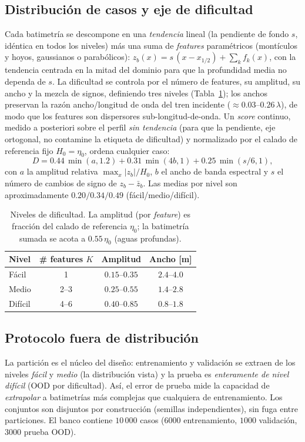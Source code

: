 \documentclass[conference]{IEEEtran}
\newcommand{\zb}{z_b}
\begin{document}
\subsection{Distribución de casos y eje de dificultad}
Cada batimetría se descompone en una \emph{tendencia} lineal (la pendiente de
fondo $s$, idéntica en todos los niveles) más una suma de \emph{features}
paramétricos (montículos y hoyos, gaussianos o parabólicos):
$\zb(x) = s\,(x - x_{1/2}) + \sum_k f_k(x)$, con la tendencia centrada en la
mitad del dominio para que la profundidad media no dependa de $s$. La
dificultad se controla por el número de features, su amplitud, su ancho y la
mezcla de signos, definiendo tres niveles (Tabla~\ref{tab:tiers}); los anchos
preservan la razón ancho/longitud de onda del tren incidente
($\approx0.03$--$0.26\,\lambda$), de modo que los features son dispersores
sub-longitud-de-onda. Un \emph{score} continuo, medido a posteriori sobre el
perfil \emph{sin tendencia} (para que la pendiente, eje ortogonal, no
contamine la etiqueta de dificultad) y normalizado por el calado de referencia
fijo $H_0=\eta_0$, ordena cualquier caso:
\begin{equation}
  D = 0.44\,\min(a,1.2) + 0.31\,\min(4b,1) + 0.25\,\min(s/6,1),
  \label{eq:score}
\end{equation}
con $a$ la amplitud relativa $\max_x|\zb|/H_0$, $b$ el ancho de banda espectral y
$s$ el número de cambios de signo de $\zb-\bar\zb$. Las medias por nivel son
aproximadamente $0.20/0.34/0.49$ (fácil/medio/difícil).

\begin{table}[t]
\centering
\caption{Niveles de dificultad. La amplitud (por \emph{feature}) es fracción del
calado de referencia $\eta_0$; la batimetría sumada se acota a $0.55\,\eta_0$
(aguas profundas).}
\label{tab:tiers}
\begin{tabular}{lccc}
\toprule
Nivel & \# features $K$ & Amplitud & Ancho [m] \\
\midrule
Fácil   & 1   & $0.15$–$0.35$ & $2.4$–$4.0$ \\
Medio   & 2–3 & $0.25$–$0.55$ & $1.4$–$2.8$ \\
Difícil & 4–6 & $0.40$–$0.85$ & $0.8$–$1.8$ \\
\bottomrule
\end{tabular}
\end{table}

\subsection{Protocolo fuera de distribución}
La partición es el núcleo del diseño: entrenamiento y validación se extraen de
los niveles \emph{fácil} y \emph{medio} (la distribución vista) y la prueba es
\emph{enteramente de nivel difícil} (OOD por dificultad). Así, el error de
prueba mide la capacidad de \emph{extrapolar} a batimetrías más complejas que
cualquiera de entrenamiento. Los conjuntos son disjuntos por construcción
(semillas independientes), sin fuga entre particiones. El banco contiene
$10\,000$ casos ($6000$ entrenamiento, $1000$ validación, $3000$ prueba OOD).
\end{document}
